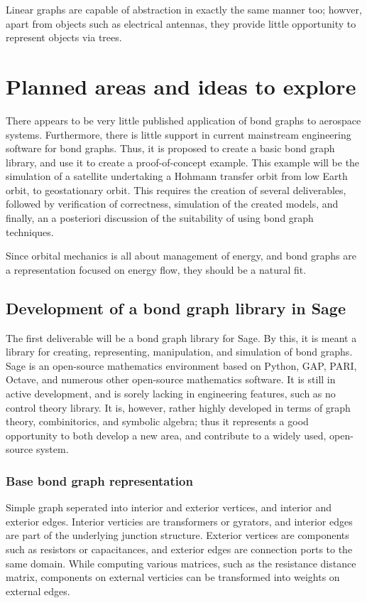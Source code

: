 \documentclass[utf,a4paper,12pt]{report}
\begin{document}
Linear graphs are capable of abstraction in exactly the same manner too; howver, apart from objects such as electrical antennas, they provide little opportunity to represent objects via trees.
\chapter{Planned areas and ideas to explore}
There appears to be very little published application of bond graphs to aerospace systems. Furthermore, there is little support in current mainstream engineering software for bond graphs. Thus, it is proposed to create a basic bond graph library, and use it to create a proof-of-concept example. This example will be the simulation of a satellite undertaking a Hohmann transfer orbit from low Earth orbit, to geostationary orbit. This requires the creation of several deliverables, followed by verification of correctness, simulation of the created models, and finally, an a posteriori discussion of the suitability of using bond graph techniques.

Since orbital mechanics is all about management of energy, and bond graphs are a representation focused on energy flow, they should be a natural fit.
\section{Development of a bond graph library in Sage}
The first deliverable will be a bond graph library for Sage. By this, it is meant a library for creating, representing, manipulation, and simulation of bond graphs.
Sage is an open-source mathematics environment based on Python, GAP, PARI, Octave, and numerous other open-source mathematics software. It is still in active development, and is sorely lacking in engineering features, such as no control theory library. It is, however, rather highly developed in terms of graph theory, combinitorics, and symbolic algebra; thus it represents a good opportunity to both develop a new area, and contribute to a widely used, open-source system.
\subsection{Base bond graph representation}
Simple graph seperated into interior and exterior vertices, and interior and exterior edges. Interior verticies are transformers or gyrators, and interior edges are part of the underlying junction structure. Exterior vertices are components such as resistors or capacitances, and exterior edges are connection ports to the same domain. While computing various matrices, such as the resistance distance matrix, components on external verticies can be transformed into weights on external edges.
\end{document}
